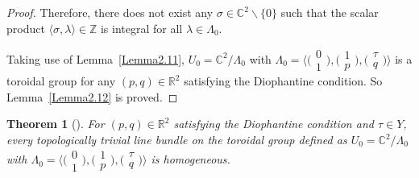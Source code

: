 \documentclass[pdftex]{sigma}
\numberwithin{equation}{section}
\newtheorem{Theorem}{Theorem}[section]
\begin{document}
\begin{proof}
Therefore, there does not exist any $\sigma \in \mathbb{C}^2 \backslash \{ 0 \}$ such that the scalar product $\langle \sigma,\lambda \rangle \in \mathbb{Z}$ is integral for all $ \lambda \in \Lambda_0 $.

Taking use of Lemma~\ref{Lemma2.11}, $U_0=\mathbb{C}^2/\Lambda_0$ with $\Lambda_0=\bigl\langle\bigl(\begin{smallmatrix}0 \\1\end{smallmatrix}\bigr),\bigl(\begin{smallmatrix}1 \\p\end{smallmatrix}\bigr),\bigl(\begin{smallmatrix}\tau \\q\end{smallmatrix}\bigr)\bigr\rangle$ is a toroidal group for any $(p,q) \in \mathbb{R}^2$ satisfying the Diophantine condition. So Lemma~\ref{Lemma2.12} is proved.
\end{proof}


\begin{Theorem}[{\cite[Proposition~2.4]{Takayuki-Takato2}}] \label{Theorem2.13}
 For $(p,q) \in \mathbb{R}^2$ satisfying the Diophantine condition and $\tau \in Y$, every topologically trivial line bundle on the toroidal group defined as $U_0=\mathbb{C}^2/\Lambda_0$ with $\Lambda_0=\bigl\langle\bigl(\begin{smallmatrix}0 \\1\end{smallmatrix}\bigr),\bigl(\begin{smallmatrix}1 \\p\end{smallmatrix}\bigr),\bigl(\begin{smallmatrix}\tau \\q\end{smallmatrix}\bigr)\bigr\rangle$ is homogeneous.
\end{Theorem}
\end{document}
